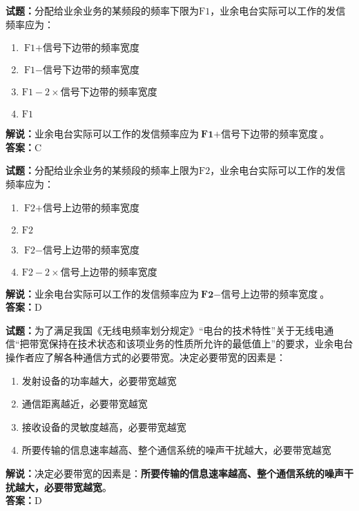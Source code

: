 \documentclass{ctexbook}
\begin{document}
\bigskip




\noindent\textbf{试题：}分配给业余业务的某频段的频率下限为\(\textrm{F1}\)，业余电台实际可以工作的发信频率应为：
\begin{enumerate}[leftmargin=3em]
\item \(\textrm{F1} + \textrm{信号下边带的频率宽度}\)
\item \(\textrm{F1} - \textrm{信号下边带的频率宽度}\)
\item \(\textrm{F1} - 2 \times \textrm{信号下边带的频率宽度}\)
\item \(\textrm{F1}\)
\end{enumerate}
\noindent\textbf{解说：}业余电台实际可以工作的发信频率应为\(\textbf{F1} + \textbf{信号下边带的频率宽度}\)。
\\\noindent\textbf{答案：}C

\bigskip




\noindent\textbf{试题：}分配给业余业务的某频段的频率上限为\(\textrm{F2}\)，业余电台实际可以工作的发信频率应为：
\begin{enumerate}[leftmargin=3em]
\item \(\textrm{F2} + \textrm{信号上边带的频率宽度}\)
\item \(\textrm{F2}\)
\item \(\textrm{F2} - \textrm{信号上边带的频率宽度}\)
\item \(\textrm{F2} - 2 \times \textrm{信号上边带的频率宽度}\)
\end{enumerate}
\noindent\textbf{解说：}业余电台实际可以工作的发信频率应为\(\textbf{F2} - \textbf{信号上边带的频率宽度}\)。
\\\noindent\textbf{答案：}D

\bigskip




\noindent\textbf{试题：}为了满足我国《无线电频率划分规定》“电台的技术特性”关于无线电通信“把带宽保持在技术状态和该项业务的性质所允许的最低值上”的要求，业余电台操作者应了解各种通信方式的必要带宽。决定必要带宽的因素是：
\begin{enumerate}[leftmargin=3em]
\item 发射设备的功率越大，必要带宽越宽
\item 通信距离越近，必要带宽越宽
\item 接收设备的灵敏度越高，必要带宽越宽
\item 所要传输的信息速率越高、整个通信系统的噪声干扰越大，必要带宽越宽
\end{enumerate}
\noindent\textbf{解说：}决定必要带宽的因素是：\textbf{所要传输的信息速率越高、整个通信系统的噪声干扰越大，必要带宽越宽}。\\\noindent\textbf{答案：}D
\end{document}
